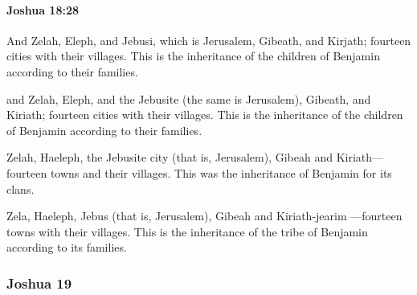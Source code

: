 		\paragraph{Joshua 18:28} %
			\label{JOSHUA-18-28}

			And Zelah, Eleph, and Jebusi, which is Jerusalem, Gibeath, and Kirjath; fourteen cities with their villages. This is the inheritance of the children of Benjamin according to their families.

			\begin{versebox}
					\item[BHS] 
					\item[ASV] and Zelah, Eleph, and the Jebusite (the same is Jerusalem), Gibeath, and Kiriath; fourteen cities with their villages. This is the inheritance of the children of Benjamin according to their families.
					\item[NIV] Zelah, Haeleph, the Jebusite city (that is, Jerusalem), Gibeah and Kiriath—fourteen towns and their villages. This was the inheritance of Benjamin for its clans.
					\item[NRSV] Zela, Haeleph, Jebus (that is, Jerusalem), Gibeah and Kiriath-jearim —fourteen towns with their villages. This is the inheritance of the tribe of Benjamin according to its families.
			\end{versebox}
	\subsubsection{Joshua 19} %
		\label{JOSHUA-19}

